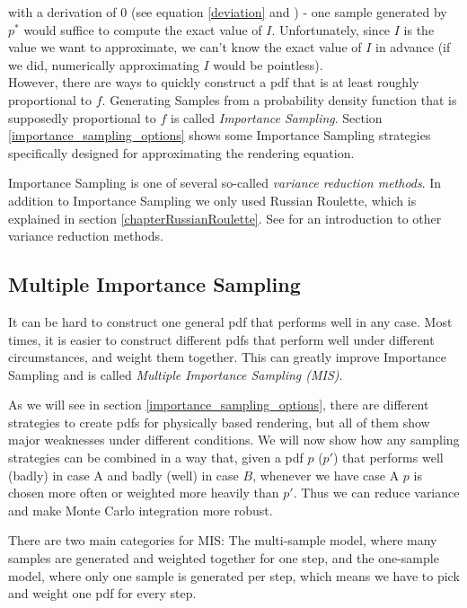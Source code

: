 with a derivation of $0$ (see equation \ref{deviation} and \cite[chapter 2.5.2]{veachdiss}) - one sample generated by $p^*$ would suffice to compute the exact value of $I$. Unfortunately, since $I$ is the value we want to approximate, we can't know the exact value of $I$ in advance (if we did, numerically approximating $I$ would be pointless).\\
However, there are ways to quickly construct a pdf that is at least roughly proportional to $f$. Generating Samples from a probability density function that is supposedly proportional to $f$ is called \emph{Importance Sampling}. Section \ref{importance_sampling_options} shows some Importance Sampling strategies specifically designed for approximating the rendering equation.

Importance Sampling is one of several so-called \emph{variance reduction methods}. In addition to Importance Sampling we only used Russian Roulette, which is explained in section \ref{chapterRussianRoulette}. See \cite[chapters 2.5 - 2.8]{veachdiss} for an introduction to other variance reduction methods.


\subsection{Multiple Importance Sampling}
\label{multiple importance sampling}
It can be hard to construct one general pdf that performs well in any case. Most times, it is easier to construct different pdfs that perform well under different circumstances, and weight them together. This can greatly improve Importance Sampling and is called \emph{Multiple Importance Sampling (MIS)}.

As we will see in section \ref{importance_sampling_options}, there are different strategies to create pdfs for physically based rendering, but all of them show major weaknesses under different conditions. We will now show how any sampling strategies can be combined in a way that, given a pdf $p$ ($p'$) that performs well (badly) in case A and badly (well) in case $B$, whenever we have case A $p$ is chosen more often or weighted more heavily than $p'$. Thus we can reduce variance and make Monte Carlo integration more robust.

There are two main categories for MIS: The multi-sample model, where many samples are generated and weighted together for one step, and the one-sample model, where only one sample is generated per step, which means we have to pick and weight one pdf for every step.

